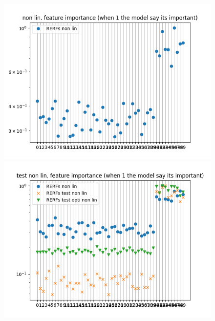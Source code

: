 \documentclass{article}
\begin{document}
\newpage
\begin{figure}
\includegraphics[scale=0.7]{train_non_linear_feature_importance.png}

\includegraphics[scale=0.7]{test_non_linear_feature_importance.png}
\end{figure}
\end{document}
